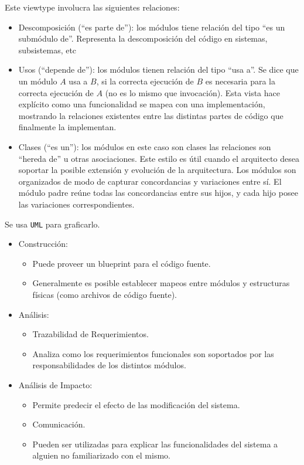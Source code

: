 \documentclass[]{article}
\begin{document}
Este viewtype involucra las siguientes relaciones:
\begin{itemize}
    \item Descomposición (``es parte de''): los módulos tiene relación del tipo ``es un submódulo de''. Representa la descomposición del código en sistemas, subsistemas, etc
    \item Usos (``depende de''): los módulos tienen relación del tipo ``usa a''. Se dice que un módulo $A$ usa a $B$, si la correcta ejecución de $B$ es necesaria para la correcta ejecución de $A$ (no es lo mismo que invocación). Esta vista hace explícito como una funcionalidad se mapea con una implementación, mostrando la relaciones existentes entre las distintas partes de código que finalmente la implementan.
    \item Clases (``es un''): los módulos en este caso son clases las relaciones son ``hereda de'' u otras asociaciones. Este estilo es útil cuando el arquitecto desea soportar la posible extensión y evolución de la arquitectura. Los módulos son organizados de modo de capturar concordancias y variaciones entre sí. El módulo padre reúne todas las concordancias entre sus hijos, y cada hijo posee las variaciones correspondientes.
\end{itemize}


Se usa \texttt{UML} para graficarlo.

\begin{itemize}
    \item Construcción:
    \begin{itemize}
        \item Puede proveer un blueprint para el código fuente.
        \item Generalmente es posible establecer mapeos entre módulos y estructuras físicas (como archivos de código fuente).
    \end{itemize}
    \item Análisis:
    \begin{itemize}
        \item Trazabilidad de Requerimientos.
        \item Analiza como los requerimientos funcionales son soportados por las responsabilidades de los distintos módulos.
    \end{itemize}
    \item Análisis de Impacto:
    \begin{itemize}
        \item Permite predecir el efecto de las modificación del sistema.
        \item Comunicación.
        \item Pueden ser utilizadas para explicar las funcionalidades del sistema a alguien no familiarizado con el mismo.
    \end{itemize}
\end{itemize}
\end{document}
